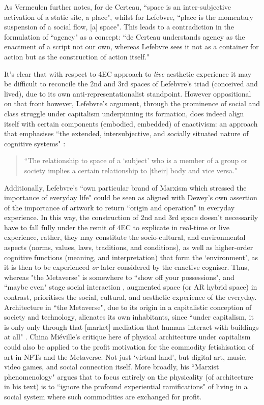 As Vermeulen further notes, for de Certeau, ``space is an inter-subjective activation of a static site, a place", whilst for Lefebvre, ``place is the momentary suspension of a social flow, [a] space". This leads to a contradiction in the formulation of ``agency" as a concept: ``de Certeau understands agency as the enactment of a script not our own, whereas Lefebvre sees it not as a container for action but as the construction of action itself." 

It's clear that with respect to 4EC approach to \textit{live} aesthetic experience it may be difficult to reconcile the 2nd and 3rd spaces of Lefebvre's triad (conceived and lived), due to its own anti-representationalist standpoint. However oppositional on that front however, Lefebvre's argument, through the prominence of social and class struggle under capitalism underpinning its formation, does indeed align itself with certain components (embodied, embedded) of enactivism: an approach that emphasises ``the extended, intersubjective, and socially situated nature of cognitive systems" \citep[p. 6]{gallagher2017}: 
\begin{quote}
    ``The relationship to space of a `subject' who is a member of a group or society implies a certain relationship to [their] body and vice versa." \cite[p. 40]{lefebvre1991}
\end{quote}
Additionally, Lefebvre's ``own particular brand of Marxism which stressed the importance of everyday life" \citep[p. 8]{merrifield1993} could be seen as aligned with Dewey's own assertion of the importance of artwork to return ``origin and operation" in everyday experience. In this way, the construction of 2nd and 3rd space doesn't necessarily have to fall fully under the remit of 4EC to explicate in real-time or live experience, rather, they may constitute the socio-cultural, and environmental aspects (norms, values, laws, traditions, and  conditions), as well as higher-order cognitive functions (meaning, and interpretation) that form the `environment', as it is then to be experienced \textit{or} later considered by the enactive cogniser.
Thus, whereas "the Metaverse" is somewhere to ``show off your possessions", and ``maybe even" stage social interaction \citep{marr2022}, augmented space (or AR hybrid space) in contrast, prioritises the social, cultural, and aesthetic experience of the everyday. Architecture in ``the Metaverse", due to its origin in a capitalistic conception of society and technology, alienates its own inhabitants, since ``under capitalism, it is only only through that [market] mediation that humans interact with buildings at all" \citep[p. 18]{mieville1998}. China Miéville's critique here of physical architecture under capitalism could also be applied to the profit motivation for the commodity fetishisation of art in NFTs and the Metaverse. Not just `virtual land', but digital art, music, video games, and social connection itself. More broadly, his ``Marxist phenomenology" argues that to focus entirely on the physicality (of architecture in his text) is to ``ignore the profound experiential ramifications" of living in a social system where such commodities are exchanged for profit. 


